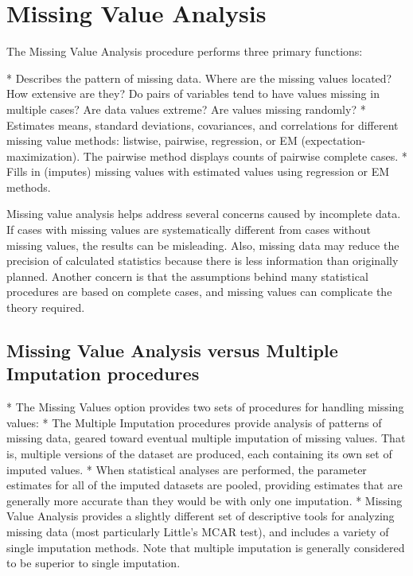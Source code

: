 \section{Missing Value Analysis}
%
The Missing Value Analysis procedure performs three primary functions:


*  Describes the pattern of missing data. Where are the missing values located? How extensive
are they? Do pairs of variables tend to have values missing in multiple cases? Are data
values extreme? Are values missing randomly?
*  Estimates means, standard deviations, covariances, and correlations for different missing
value methods: listwise, pairwise, regression, or EM (expectation-maximization). The
pairwise method displays counts of pairwise complete cases.
*  Fills in (imputes) missing values with estimated values using regression or EM methods.


Missing value analysis helps address several concerns caused by incomplete data. If cases with
missing values are systematically different from cases without missing values, the results can be
misleading. Also, missing data may reduce the precision of calculated statistics because there
is less information than originally planned. Another concern is that the assumptions behind
many statistical procedures are based on complete cases, and missing values can complicate
the theory required.



\subsection{Missing Value Analysis versus Multiple Imputation procedures}

*  The Missing Values option provides two sets of procedures for handling missing values:
*  The Multiple Imputation procedures provide analysis of patterns of missing data, geared toward eventual multiple imputation of missing values. That is, multiple versions of the dataset are produced, each containing its own set of imputed values. *  When statistical analyses are performed, the parameter estimates for all of the imputed datasets are pooled, providing estimates that are generally more accurate than they would be with only one imputation.
* 
Missing Value Analysis provides a slightly different set of descriptive tools for analyzing missing data (most particularly Little's MCAR test), and includes a variety of single imputation methods. Note that multiple imputation is generally considered to be superior to single imputation.



